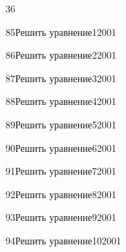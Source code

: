 \begin{TrigSourcePage}{36}
\begin{TrigExercise}{85}{Решить уравнение}{1}{2001}
\end{TrigExercise}
\begin{TrigExercise}{86}{Решить уравнение}{2}{2001}
\end{TrigExercise}
\begin{TrigExercise}{87}{Решить уравнение}{3}{2001}
\end{TrigExercise}
\begin{TrigExercise}{88}{Решить уравнение}{4}{2001}
\end{TrigExercise}
\begin{TrigExercise}{89}{Решить уравнение}{5}{2001}
\end{TrigExercise}
\begin{TrigExercise}{90}{Решить уравнение}{6}{2001}
\end{TrigExercise}
\begin{TrigExercise}{91}{Решить уравнение}{7}{2001}
\end{TrigExercise}
\begin{TrigExercise}{92}{Решить уравнение}{8}{2001}
\end{TrigExercise}
\begin{TrigExercise}{93}{Решить уравнение}{9}{2001}
\end{TrigExercise}
\begin{TrigExercise}{94}{Решить уравнение}{10}{2001}
\end{TrigExercise}

\end{TrigSourcePage}

